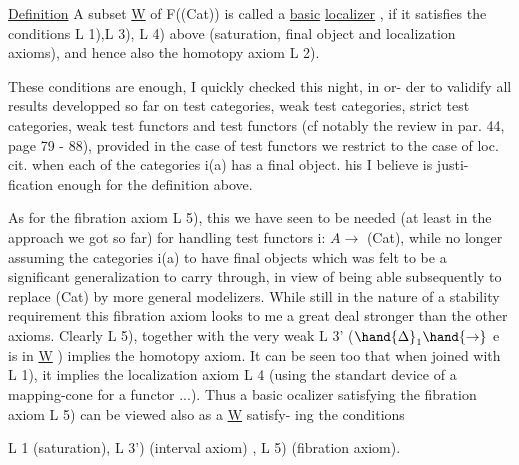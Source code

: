 
\uline{Definition}  A subset \underline{W} of F((Cat)) is called a \uline{basic} \uline{localizer} ,  if it
satisfies the conditions L 1),L 3), L 4) above (saturation, final object
and localization axioms),  and hence also the homotopy axiom L 2).

These conditions are enough,  I quickly checked this night,  in or-%
der to validify all results developped so far on test categories, weak
test categories,  strict test categories,  weak test functors and test
functors  (cf notably the review in par. 44, page 79 - 88),   provided
in the case of test functors we restrict to the case of loc. cit. when
each of the categories i(a) has a final object.  his I believe is justi-%
fication enough for the definition above.

As for the fibration axiom\xout{\unsure{(}} L 5),  this we have seen to be needed
(at least in the approach we got so far) for handling test functors
i: $A \longrightarrow$ (Cat),  while no longer assuming the categories i(a) to have final
objects\hand{,} \hand{(}which was felt to be a significant generalization to carry
through,  in view of being able subsequently to replace (Cat) by more
general modelizers\hand{)}. While still in the nature of a stability requirement\hand{,}
this fibration axiom looks to me a great deal stronger than the other
axioms.  Clearly L 5),  together with the very weak  L 3' ($\hand{\Delta}_1 \hand{\to}$ e is in
\hand{\unsure{$\vee$}}\underline{W} )  implies the homotopy axiom.  It can be seen too that when joined
with L 1),  it implies the localization axiom L 4 (using the standart
device of a mapping-cone for a functor ...)\hand{*}.  Thus a basic ocalizer
satisfying the fibration axiom L 5)  can be viewed also as a \underline{W}  satisfy-%
ing the conditions

L 1 (saturation),  L 3') (interval axiom) , L 5) (fibration axiom).

